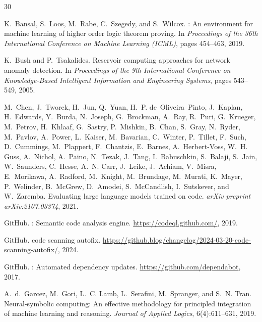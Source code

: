 \documentclass[11pt,a4paper]{article}
\begin{document}
\begin{thebibliography}{30}

K.~Bansal, S.~Loos, M.~Rabe, C.~Szegedy, and S.~Wilcox.
: An environment for machine learning of higher order logic theorem proving.
\newblock In \emph{Proceedings of the 36th International Conference on Machine Learning (ICML)}, pages 454--463, 2019.

K.~Bush and P.~Tsakalides.
\newblock Reservoir computing approaches for network anomaly detection.
\newblock In \emph{Proceedings of the 9th International Conference on Knowledge-Based Intelligent Information and Engineering Systems}, pages 543--549, 2005.

M.~Chen, J.~Tworek, H.~Jun, Q.~Yuan, H.~P. de~Oliveira~Pinto, J.~Kaplan, H.~Edwards, Y.~Burda, N.~Joseph, G.~Brockman, A.~Ray, R.~Puri, G.~Krueger, M.~Petrov, H.~Khlaaf, G.~Sastry, P.~Mishkin, B.~Chan, S.~Gray, N.~Ryder, M.~Pavlov, A.~Power, L.~Kaiser, M.~Bavarian, C.~Winter, P.~Tillet, F.~Such, D.~Cummings, M.~Plappert, F.~Chantzis, E.~Barnes, A.~Herbert-Voss, W.~H. Guss, A.~Nichol, A.~Paino, N.~Tezak, J.~Tang, I.~Babuschkin, S.~Balaji, S.~Jain, W.~Saunders, C.~Hesse, A.~N. Carr, J.~Leike, J.~Achiam, V.~Misra, E.~Morikawa, A.~Radford, M.~Knight, M.~Brundage, M.~Murati, K.~Mayer, P.~Welinder, B.~McGrew, D.~Amodei, S.~McCandlish, I.~Sutskever, and W.~Zaremba.
\newblock Evaluating large language models trained on code.
\newblock \emph{arXiv preprint arXiv:2107.03374}, 2021.

{GitHub}.
: Semantic code analysis engine.
\newblock \url{https://codeql.github.com/}, 2019.

{GitHub}.
 code scanning autofix.
\newblock \url{https://github.blog/changelog/2024-03-20-code-scanning-autofix/}, 2024.

{GitHub}.
: Automated dependency updates.
\newblock \url{https://github.com/dependabot}, 2017.

A.~d.~Garcez, M.~Gori, L.~C. Lamb, L.~Serafini, M.~Spranger, and S.~N. Tran.
\newblock Neural-symbolic computing: An effective methodology for principled integration of machine learning and reasoning.
\newblock \emph{Journal of Applied Logics}, 6(4):611--631, 2019.


\end{thebibliography}
\end{document}
